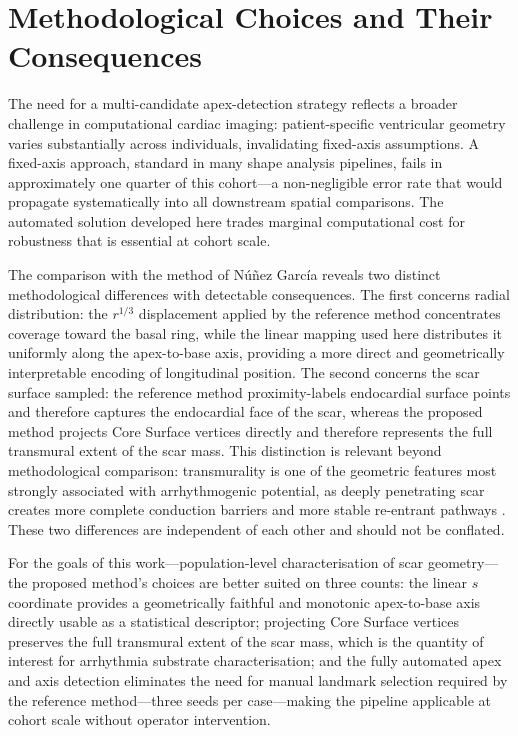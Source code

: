 \section{Methodological Choices and Their Consequences}

The need for a multi-candidate apex-detection strategy reflects a broader challenge in
computational cardiac imaging: patient-specific ventricular geometry varies substantially
across individuals, invalidating fixed-axis assumptions. A fixed-axis approach,
standard in many shape analysis pipelines, fails in approximately one quarter of this
cohort---a non-negligible error rate that would propagate systematically into all downstream
spatial comparisons. The automated solution developed here trades marginal computational
cost for robustness that is essential at cohort scale.

The comparison with the method of N\'{u}\~{n}ez Garc\'{i}a \cite{nunez2018} reveals two distinct methodological
differences with detectable consequences. The first concerns radial distribution: the $r^{1/3}$
displacement applied by the reference method concentrates coverage toward the basal ring,
while the linear mapping used here distributes it uniformly along the apex-to-base axis,
providing a more direct and geometrically interpretable encoding of longitudinal position. The
second concerns the scar surface sampled: the reference method proximity-labels
endocardial surface points and therefore captures the endocardial face of the scar, whereas
the proposed method projects Core Surface vertices directly and therefore represents the
full transmural extent of the scar mass. This distinction is relevant beyond methodological
comparison: transmurality is one of the geometric features most strongly associated with
arrhythmogenic potential, as deeply penetrating scar creates more complete conduction
barriers and more stable re-entrant pathways \cite{mahida2017, cedilnik2023}. These two
differences are independent of each other and should not be conflated.

For the goals of this work---population-level characterisation of scar geometry---the proposed
method's choices are better suited on three
counts: the linear $s$ coordinate provides a geometrically faithful and monotonic
apex-to-base axis directly usable as a statistical descriptor; projecting Core Surface vertices
preserves the full transmural extent of the scar mass, which is the quantity of interest for
arrhythmia substrate characterisation; and the fully automated apex and axis detection
eliminates the need for manual landmark selection required by the reference
method---three seeds per case---making the pipeline applicable at cohort scale without
operator intervention.

